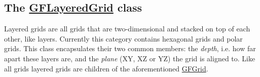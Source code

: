 \subsection*{The \hyperlink{class_g_f_layered_grid}{G\+F\+Layered\+Grid} class }

Layered grids are all grids that are two-\/dimensional and stacked on top of each other, like layers. Currently this category contains hexagonal grids and polar grids. This class encapsulates their two common members\+: the {\itshape depth}, i.\+e. how far apart these layers are, and the {\itshape plane} (X\+Y, X\+Z or Y\+Z) the grid is aligned to. Like all grids layered grids are children of the aforementioned \hyperlink{class_g_f_grid}{G\+F\+Grid}. 